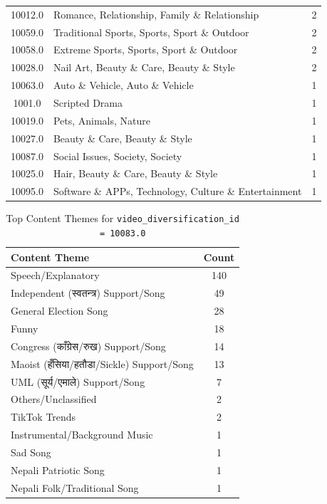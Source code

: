 \documentclass[12pt,a4paper]{report}
\begin{document}
\begin{table}[h]
\begin{tabular}{|c|p{8cm}|c|}
10012.0 & Romance, Relationship, Family \& Relationship & 2 \\
10059.0 & Traditional Sports, Sports, Sport \& Outdoor & 2 \\
10058.0 & Extreme Sports, Sports, Sport \& Outdoor & 2 \\
10028.0 & Nail Art, Beauty \& Care, Beauty \& Style & 2 \\
10063.0 & Auto \& Vehicle, Auto \& Vehicle & 1 \\
1001.0 & Scripted Drama & 1 \\
10019.0 & Pets, Animals, Nature & 1 \\
10027.0 & Beauty \& Care, Beauty \& Style & 1 \\
10087.0 & Social Issues, Society, Society & 1 \\
10025.0 & Hair, Beauty \& Care, Beauty \& Style & 1 \\
10095.0 & Software \& APPs, Technology, Culture \& Entertainment & 1 \\
\hline
\end{tabular}
\end{table}

\clearpage %
\begin{table}[h]
    \centering
    \caption{Top Content Themes for \texttt{video\_diversification\_id = 10083.0}}
    \label{tab:content_themes_10083}
    \begin{tabular}{l c}
        \toprule
        \textbf{Content Theme} & \textbf{Count} \\
        \midrule
        Speech/Explanatory & 140 \\
        Independent (\texthindi{स्वतन्त्र}) Support/Song & 49 \\
        General Election Song & 28 \\
        Funny & 18 \\
        Congress (\texthindi{काँग्रेस/रुख}) Support/Song & 14 \\
        Maoist (\texthindi{हँसिया/हतौडा}/Sickle) Support/Song & 13 \\
        UML (\texthindi{सूर्य/एमाले}) Support/Song & 7 \\
        Others/Unclassified & 2 \\
        TikTok Trends & 2 \\
        Instrumental/Background Music & 1 \\
        Sad Song & 1 \\
        Nepali Patriotic Song & 1 \\
        Nepali Folk/Traditional Song & 1 \\
        \bottomrule
    \end{tabular}
\end{table}
\end{document}
